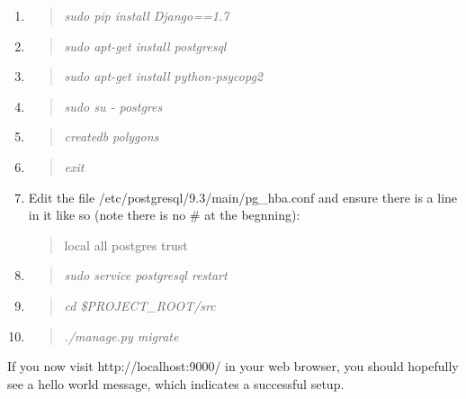 \documentclass[12pt]{article}
\newenvironment{command}
   { 
      \begin{quote}\itshape
      \color{blue}
   }
   { \end{quote} }
\newenvironment{data}
   { 
      \begin{quote}\itshape
      \color{red}
   }
   { \end{quote} }
\begin{document}
\begin{enumerate}
   \item \begin{command} sudo pip install Django==1.7 \end{command}
   \item \begin{command} sudo apt-get install postgresql \end{command}
   \item \begin{command} sudo apt-get install python-psycopg2 \end{command}
   \item \begin{command} sudo su - postgres \end{command}
   \item \begin{command} createdb polygons \end{command}
   \item \begin{command} exit \end{command}
   \item Edit the file /etc/postgresql/9.3/main/pg\_hba.conf and ensure there is
         a line in it like so (note there is no \# at the begnning):
         \begin{data}
         local all postgres trust
         \end{data}
   \item \begin{command} sudo service postgresql restart \end{command}
   \item \begin{command} cd \$PROJECT\_ROOT/src \end{command}
   \item \begin{command} ./manage.py migrate \end{command}
\end{enumerate}

If you now visit http://localhost:9000/ in your web browser, you should
hopefully see a hello world message, which indicates a successful setup.
\end{document}
